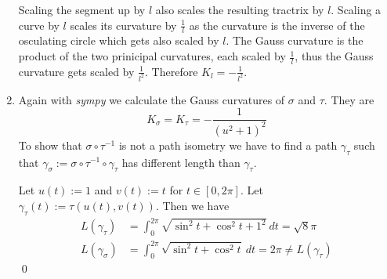 \documentclass[a4paper,11pt,notitlepage,fullpage]{article}
\begin{document}
\begin{enumerate}
Scaling the segment up by $l$ also scales the resulting tractrix by $l$. Scaling a curve by $l$ scales its curvature by $\frac{1}{l}$ as the curvature is the inverse of the osculating circle which gets also scaled by $l$. The Gauss curvature is the product of the two prinicipal curvatures, each scaled by $\frac{1}{l}$, thus the Gauss curvature gets scaled by $\frac{1}{l^2}$. Therefore $K_l = -\frac{1}{l^2}$.

\item Again with \emph{sympy} we calculate the Gauss curvatures of $\sigma$ and $\tau$. They are
\begin{equation*}
K_\sigma = K_\tau = - \frac{1}{(u^{2} + 1)^{2}}
\end{equation*}
To show that $\sigma \circ \tau^{-1}$ is not a path isometry we have to find a path $\gamma_\tau$ such that $\gamma_\sigma := \sigma \circ \tau^{-1} \circ \gamma_\tau$ has different length than $\gamma_\tau$.

Let $u(t) := 1$ and $v(t) := t$ for $t \in [0,2\pi]$. Let $\gamma_\tau(t) := \tau(u(t), v(t))$. Then we have 
\begin{align*}
L(\gamma_\tau) &= \int_0^{2\pi} \sqrt{\sin^2t + \cos^2t + 1^2}~dt = \sqrt{8} \pi \\
L(\gamma_\sigma) &= \int_0^{2\pi} \sqrt{\sin^2t + \cos^2t}~dt = 2 \pi \neq L(\gamma_\tau)
\end{align*}
\qed


\end{enumerate}
\end{document}
